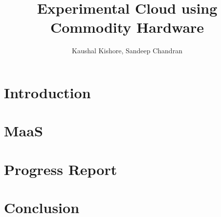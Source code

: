 \documentclass[aspectratio=169,11pt]{beamer}
\title[Endsem Report]{Experimental Cloud using Commodity Hardware}
\author[111601008]{Kaushal Kishore, Sandeep Chandran}
\begin{document}


\section{Introduction} 


\section{MaaS}


\section{Progress Report}


\section{Conclusion}


% 

% 

% 

% 

% 

% 
\end{document}
